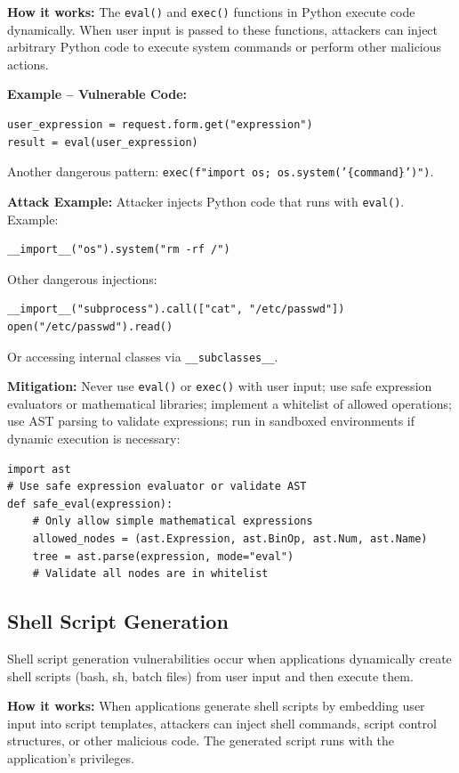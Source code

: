 \textbf{How it works:} The \texttt{eval()} and \texttt{exec()} functions in Python execute code dynamically. When user input is passed to these functions, attackers can inject arbitrary Python code to execute system commands or perform other malicious actions.

\textbf{Example -- Vulnerable Code:}

\begin{lstlisting}[style=pycode]
user_expression = request.form.get("expression")
result = eval(user_expression)
\end{lstlisting}
Another dangerous pattern: \texttt{exec(f"import os; os.system('\{command\}')")}.

\textbf{Attack Example:} Attacker injects Python code that runs with \texttt{eval()}. Example:
\begin{lstlisting}[style=pycode]
__import__("os").system("rm -rf /")
\end{lstlisting}
Other dangerous injections:
\begin{lstlisting}[style=pycode]
__import__("subprocess").call(["cat", "/etc/passwd"])
open("/etc/passwd").read()
\end{lstlisting}
Or accessing internal classes via \texttt{\_\_subclasses\_\_}.

\textbf{Mitigation:} Never use \texttt{eval()} or \texttt{exec()} with user input; use safe expression evaluators or mathematical libraries; implement a whitelist of allowed operations; use AST parsing to validate expressions; run in sandboxed environments if dynamic execution is necessary:

\begin{lstlisting}[style=pycode]
import ast
# Use safe expression evaluator or validate AST
def safe_eval(expression):
    # Only allow simple mathematical expressions
    allowed_nodes = (ast.Expression, ast.BinOp, ast.Num, ast.Name)
    tree = ast.parse(expression, mode="eval")
    # Validate all nodes are in whitelist
\end{lstlisting}

\subsection{Shell Script Generation}
\label{sec:cmd_shell_script}

Shell script generation vulnerabilities occur when applications dynamically create shell scripts (bash, sh, batch files) from user input and then execute them.

\textbf{How it works:} When applications generate shell scripts by embedding user input into script templates, attackers can inject shell commands, script control structures, or other malicious code. The generated script runs with the application's privileges.

